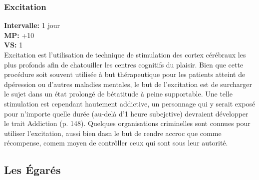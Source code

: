 \subsubsection{Excitation} \textbf{Intervalle:} 1 jour \\ \textbf{MP:} +10 \\ \textbf{VS:} 1 \\ Excitation est l'utilisation de technique de stimulation des cortex cérébraux les plus profonds afin de chatouiller les centres cognitifs du plaisir. Bien que cette procédure soit souvent utilisée à but thérapeutique pour les patients atteint de dpéression ou d'autres maladies mentales, le but de l'excitation est de surcharger le sujet dans un état prolongé de bétatitude à peine supportable. Une telle stimulation est cependant hautement addictive, un personnage qui y serait exposé pour n'importe quelle durée (au-delà d'1 heure subejctive) devraient développer le trait Addiction (p. 148). Quelques organisations criminelles sont connues pour utiliser l'excitation, aussi bien dasn le but de rendre accroc que comme récompense, comem moyen de contrôller ceux qui sont sous leur autorité. 



\subsection{Les Égarés} 

